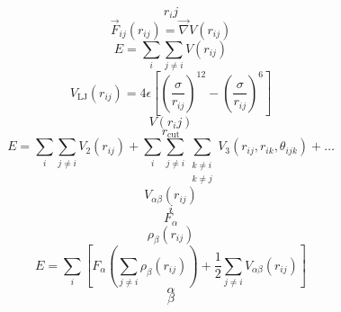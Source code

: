 \documentclass{scrreprt}
\begin{document}
\begin{equation}
r_ij
\end{equation}
\begin{equation}
  \label{eq:pairforce}
  \vec F_{ij}(r_{ij}) = \vec\nabla V(r_{ij})
\end{equation}
\begin{equation}
  \label{eq:pairenergy}
  E = \sum_i\sum_{j \neq i}{V(r_{ij})}
\end{equation}
\begin{equation}
  \label{eq:lennardjones}
  V_\text{LJ}(r_{ij}) = 4 \epsilon \left[\left(\frac{\sigma}{r_{ij}}\right)^{12} - \left(\frac{\sigma}{r_{ij}}\right)^{6}\right]
\end{equation}
\begin{equation}
V(r_ij)
\end{equation}
\begin{equation}
r_\text{cut}
\end{equation}
\begin{equation}
  \label{eq:nbody-energy}
  E = \sum_i\sum_{j \neq i}{V_2\left(r_{ij}\right)} + \sum_i\sum_{j \neq i}\sum_{\substack{k \neq i \\ k \neq j}}{V_3\left(r_{ij}, r_{ik}, \theta_{ijk}\right)} + \dots
\end{equation}
\begin{equation}
V_{\alpha\beta}(r_{ij})
\end{equation}
\begin{equation}
i
\end{equation}
\begin{equation}
F_\alpha
\end{equation}
\begin{equation}
\rho_\beta(r_{ij})
\end{equation}
\begin{equation}
  \label{eq:eam-energy}
  E = \sum_i\left[F_\alpha\left(\sum_{j\neq i}{\rho_\beta\left(r_{ij}\right)}\right) + \frac{1}{2}\sum_{j\neq i}{V_{\alpha\beta}\left(r_{ij}\right)}\right]
\end{equation}
\begin{equation}
\alpha
\end{equation}
\begin{equation}
\beta
\end{equation}
\end{document}
